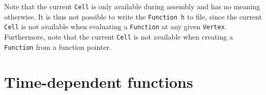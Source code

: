 Note that the current \texttt{Cell} is only available during assembly
and has no meaning otherwise. It is thus not possible to write the
\texttt{Function}~\texttt{h} to file, since the current \texttt{Cell}
is not available when evaluating a \texttt{Function} at any given
\texttt{Vertex}. Furthermore, note that the current \texttt{Cell} is
not available when creating a \texttt{Function} from a function pointer.

\section{Time-dependent functions}

